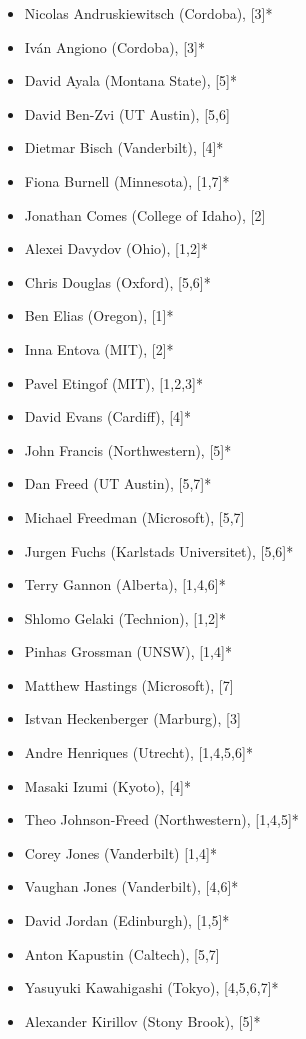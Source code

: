 \documentclass[12pt]{article}
\begin{document}
\begin{multicols}{2}
\begin{itemize}
  \setlength{\itemsep}{1pt}
  \setlength{\parskip}{0pt}
  \setlength{\parsep}{0pt}
\item Nicolas Andruskiewitsch (Cordoba), [3]*
\item Iv\'an Angiono (Cordoba), [3]*
\item David Ayala (Montana State), [5]*
\item David Ben-Zvi (UT Austin), [5,6]
\item Dietmar Bisch (Vanderbilt), [4]*
\item Fiona Burnell (Minnesota), [1,7]*
\item Jonathan Comes (College of Idaho), [2]
\item Alexei Davydov (Ohio), [1,2]*
\item Chris Douglas (Oxford), [5,6]*
\item Ben Elias (Oregon), [1]*
\item Inna Entova (MIT), [2]*
\item Pavel Etingof (MIT), [1,2,3]*
\item David Evans (Cardiff), [4]*
\item John Francis (Northwestern), [5]*
\item Dan Freed (UT Austin), [5,7]*
\item Michael Freedman (Microsoft), [5,7]
\item Jurgen Fuchs (Karlstads Universitet), [5,6]*
\item Terry Gannon (Alberta), [1,4,6]*
\item Shlomo Gelaki (Technion), [1,2]*
\item Pinhas Grossman (UNSW), [1,4]*
\item Matthew Hastings (Microsoft), [7]
\item Istvan Heckenberger (Marburg), [3]
\item Andre Henriques (Utrecht), [1,4,5,6]*
\item Masaki Izumi (Kyoto), [4]*
\item Theo Johnson-Freed (Northwestern), [1,4,5]*
\item Corey Jones (Vanderbilt) [1,4]*
\item Vaughan Jones (Vanderbilt), [4,6]*
\item David Jordan (Edinburgh), [1,5]*
\item Anton Kapustin (Caltech), [5,7]
\item Yasuyuki Kawahigashi (Tokyo), [4,5,6,7]*
\item Alexander Kirillov (Stony Brook), [5]*

\end{itemize}
\end{multicols}
\end{document}
